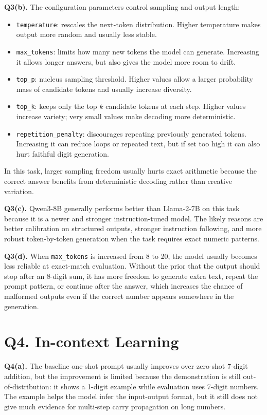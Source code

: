 \documentclass[11pt]{article}
\begin{document}
\textbf{Q3(b).} The configuration parameters control sampling and output length:
\begin{itemize}
    \item \texttt{temperature}: rescales the next-token distribution. Higher temperature makes output more random and usually less stable.
    \item \texttt{max\_tokens}: limits how many new tokens the model can generate. Increasing it allows longer answers, but also gives the model more room to drift.
    \item \texttt{top\_p}: nucleus sampling threshold. Higher values allow a larger probability mass of candidate tokens and usually increase diversity.
    \item \texttt{top\_k}: keeps only the top \(k\) candidate tokens at each step. Higher values increase variety; very small values make decoding more deterministic.
    \item \texttt{repetition\_penalty}: discourages repeating previously generated tokens. Increasing it can reduce loops or repeated text, but if set too high it can also hurt faithful digit generation.
\end{itemize}
In this task, larger sampling freedom usually hurts exact arithmetic because the correct answer benefits from deterministic decoding rather than creative variation.

\textbf{Q3(c).} Qwen3-8B generally performs better than Llama-2-7B on this task because it is a newer and stronger instruction-tuned model. The likely reasons are better calibration on structured outputs, stronger instruction following, and more robust token-by-token generation when the task requires exact numeric patterns.

\textbf{Q3(d).} When \texttt{max\_tokens} is increased from 8 to 20, the model usually becomes less reliable at exact-match evaluation. Without the prior that the output should stop after an 8-digit sum, it has more freedom to generate extra text, repeat the prompt pattern, or continue after the answer, which increases the chance of malformed outputs even if the correct number appears somewhere in the generation.

\section*{Q4. In-context Learning}

\textbf{Q4(a).} The baseline one-shot prompt usually improves over zero-shot 7-digit addition, but the improvement is limited because the demonstration is still out-of-distribution: it shows a 1-digit example while evaluation uses 7-digit numbers. The example helps the model infer the input-output format, but it still does not give much evidence for multi-step carry propagation on long numbers.
\end{document}
